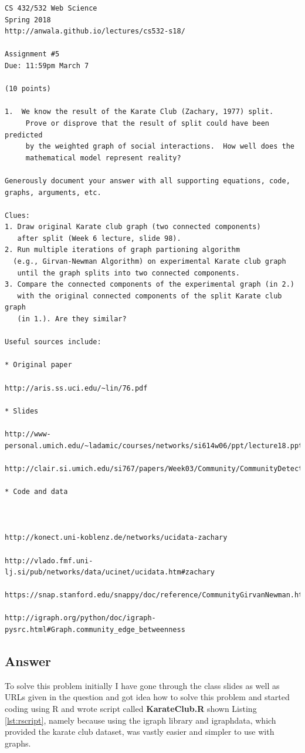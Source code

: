 \documentclass[letterpaper,11pt]{article}
\begin{document}
\begin{verbatim}
CS 432/532 Web Science
Spring 2018
http://anwala.github.io/lectures/cs532-s18/

Assignment #5
Due: 11:59pm March 7

(10 points)

1.  We know the result of the Karate Club (Zachary, 1977) split.
     Prove or disprove that the result of split could have been predicted
     by the weighted graph of social interactions.  How well does the
     mathematical model represent reality?

Generously document your answer with all supporting equations, code,
graphs, arguments, etc.

Clues: 
1. Draw original Karate club graph (two connected components) 
   after split (Week 6 lecture, slide 98).
2. Run multiple iterations of graph partioning algorithm
  (e.g., Girvan-Newman Algorithm) on experimental Karate club graph   
   until the graph splits into two connected components.
3. Compare the connected components of the experimental graph (in 2.) 
   with the original connected components of the split Karate club graph 
   (in 1.). Are they similar?

Useful sources include:

* Original paper

http://aris.ss.uci.edu/~lin/76.pdf

* Slides

http://www-personal.umich.edu/~ladamic/courses/networks/si614w06/ppt/lecture18.ppt

http://clair.si.umich.edu/si767/papers/Week03/Community/CommunityDetection.pptx

* Code and data



http://konect.uni-koblenz.de/networks/ucidata-zachary

http://vlado.fmf.uni-lj.si/pub/networks/data/ucinet/ucidata.htm#zachary

https://snap.stanford.edu/snappy/doc/reference/CommunityGirvanNewman.html

http://igraph.org/python/doc/igraph-pysrc.html#Graph.community_edge_betweenness
\end{verbatim}

\clearpage
\subsection*{Answer}

To solve this problem initially I have gone through the class slides as well as URLs given in the question and got idea how to solve this problem and started coding using R and wrote script called \textbf{KarateClub.R} shown Listing \ref{lst:rscript}, namely because using the igraph library and igraphdata, which provided the karate club dataset, was vastly easier and simpler to use with graphs.
\end{document}
